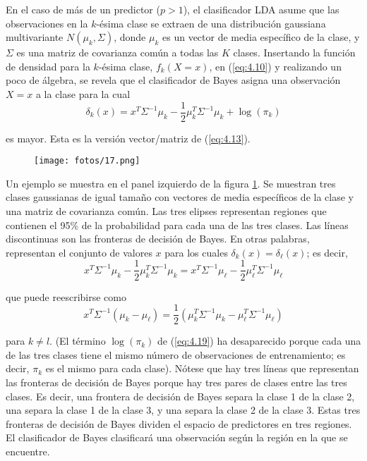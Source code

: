 En el caso de más de un predictor ($p > 1$), el clasificador LDA asume que las observaciones en la $k$-ésima clase se extraen de una distribución gaussiana multivariante $N(\mu_k, \Sigma)$, donde $\mu_k$ es un vector de media específico de la clase, y $\Sigma$ es una matriz de covarianza común a todas las $K$ clases. Insertando la función de densidad para la $k$-ésima clase, $f_k(X = x)$, en (\ref{eq:4.10}) y realizando un poco de álgebra, se revela que el clasificador de Bayes asigna una observación $X = x$ a la clase para la cual
\begin{equation}
\delta_k(x) = x^T \Sigma^{-1} \mu_k - \frac{1}{2} \mu_k^T \Sigma^{-1} \mu_k + \log(\pi_k)
\label{eq:4.19}
\end{equation}

\noindent es mayor. Esta es la versión vector/matriz de (\ref{eq:4.13}). \\

\begin{figure}[h]
\centering
\texttt{[image: fotos/17.png]}
\caption{}
\label{fig:4.6}
\end{figure}

Un ejemplo se muestra en el panel izquierdo de la figura \ref{fig:4.6}. Se muestran tres clases gaussianas de igual tamaño con vectores de media específicos de la clase y una matriz de covarianza común. Las tres elipses representan regiones que contienen el 95\% de la probabilidad para cada una de las tres clases. Las líneas discontinuas son las fronteras de decisión de Bayes. En otras palabras, representan el conjunto de valores $x$ para los cuales $\delta_k(x) = \delta_\ell(x)$; es decir,
\begin{equation}
x^T \Sigma^{-1} \mu_k - \frac{1}{2} \mu_k^T \Sigma^{-1} \mu_k = x^T \Sigma^{-1} \mu_\ell - \frac{1}{2} \mu_\ell^T \Sigma^{-1} \mu_\ell
\label{eq:4.20}
\end{equation}

\noindent que puede reescribirse como
\begin{equation}
x^T \Sigma^{-1} (\mu_k - \mu_\ell) = \frac{1}{2} (\mu_k^T \Sigma^{-1} \mu_k - \mu_\ell^T \Sigma^{-1} \mu_\ell)
\label{eq:4.20.1}
\end{equation}

\noindent para $k \neq l$. (El término $\log(\pi_k)$ de (\ref{eq:4.19}) ha desaparecido porque cada una de las tres clases tiene el mismo número de observaciones de entrenamiento; es decir, $\pi_k$ es el mismo para cada clase). Nótese que hay tres líneas que representan las fronteras de decisión de Bayes porque hay tres pares de clases entre las tres clases. Es decir, una frontera de decisión de Bayes separa la clase 1 de la clase 2, una separa la clase 1 de la clase 3, y una separa la clase 2 de la clase 3. Estas tres fronteras de decisión de Bayes dividen el espacio de predictores en tres regiones. El clasificador de Bayes clasificará una observación según la región en la que se encuentre. \\

